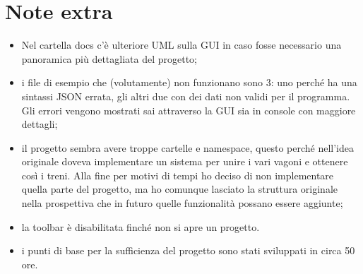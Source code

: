\documentclass[a4paper,10pt]{article}
\begin{document}
\section{Note extra}
\begin{itemize}
\item Nel cartella docs c'è ulteriore UML sulla GUI in caso fosse necessario una panoramica più dettagliata del progetto;
\item i file di esempio che (volutamente) non funzionano sono 3: uno perché ha una sintassi JSON errata, gli altri due con dei dati non validi per il programma. Gli errori vengono mostrati sai attraverso la GUI sia in console con maggiore dettagli;
\item il progetto sembra avere troppe cartelle e namespace, questo perché nell'idea originale doveva
implementare un sistema per unire i vari vagoni e ottenere così i treni. Alla fine per motivi di tempi ho deciso di non implementare quella parte del progetto, ma ho comunque lasciato la struttura originale nella prospettiva che in futuro quelle funzionalità possano essere aggiunte;
\item la toolbar è disabilitata finché non si apre un progetto.
\item i punti di base per la sufficienza del progetto sono stati sviluppati in circa 50 ore.
\end{itemize}
\end{document}
